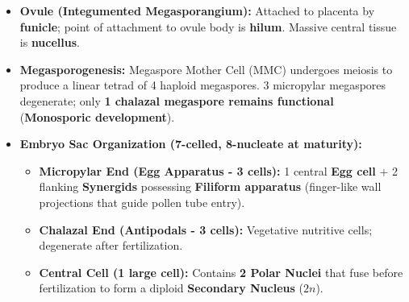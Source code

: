 \documentclass[10pt,a4paper]{article}
\begin{document}
\begin{conceptbox}
\begin{itemize}
  \item \textbf{Ovule (Integumented Megasporangium):} Attached to placenta by \textbf{funicle}; point of attachment to ovule body is \textbf{hilum}. Massive central tissue is \textbf{nucellus}.
  \item \textbf{Megasporogenesis:} Megaspore Mother Cell (MMC) undergoes meiosis to produce a linear tetrad of 4 haploid megaspores. 3 micropylar megaspores degenerate; only \textbf{1 chalazal megaspore remains functional} (\textbf{Monosporic development}).
  \item \textbf{Embryo Sac Organization (7-celled, 8-nucleate at maturity):}
  \begin{itemize}
    \item \textbf{Micropylar End (Egg Apparatus - 3 cells):} 1 central \textbf{Egg cell} $+$ 2 flanking \textbf{Synergids} possessing \textbf{Filiform apparatus} (finger-like wall projections that guide pollen tube entry).
    \item \textbf{Chalazal End (Antipodals - 3 cells):} Vegetative nutritive cells; degenerate after fertilization.
    \item \textbf{Central Cell (1 large cell):} Contains \textbf{2 Polar Nuclei} that fuse before fertilization to form a diploid \textbf{Secondary Nucleus} ($2n$).
  \end{itemize}
\end{itemize}
\end{conceptbox}
\end{document}

